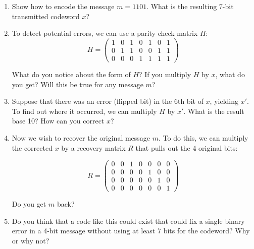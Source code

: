 \documentclass[11pt]{article}
\newif\ifsolutions
\begin{document}
\begin{enumerate}
\begin{enumerate}

\item Show how to encode the message $m=1101$.  What is the resulting 7-bit transmitted codeword $x$?
\vspace{15mm}

\ifsolutions 
\vspace{-15mm}
{\color{blue}{
\textbf{Solutions:} $Gm = x = 1010101$.
}}
\fi

\item To detect potential errors, we can use a parity check matrix $H$:
\[ H = \left( \begin{array}{ccccccc} 1 & 0 & 1 & 0 & 1 & 0 & 1 \\
0 & 1 & 1 & 0 & 0 & 1 & 1 \\
0 & 0 & 0 & 1 & 1 & 1 & 1
\end{array} \right)
\]

What do you notice about the form of $H$?  If you multiply $H$ by $x$, what do you get? Will this be true for any message $m$?
\vspace{10mm}

\item Suppose that there was an error (flipped bit) in the 6th bit of $x$, yielding $x'$. To find out where it occurred, we can multiply $H$ by $x'$. What is the result base 10? How can you correct $x$?
\vspace{15mm}

\ifsolutions 
\vspace{-15mm}
{\color{blue}{
\textbf{Solutions:} We actually received $x' = 1010111$. Computing $Hx'$, we get the sixth column of $H$, which corresponds to 6 in binary, so we know the 6th bit should be flipped to correct $x$.
}}
\fi

\item Now we wish to recover the original message $m$. To do this, we can multiply the corrected $x$ by a recovery matrix $R$ that pulls out the 4 original bits:

\[ R = \left( \begin{array}{ccccccc} 0 & 0 & 1 & 0 & 0 & 0 & 0 \\
0 & 0 & 0 & 0 & 1 & 0 & 0 \\
0 & 0 & 0 & 0 & 0 & 1 & 0 \\
0 & 0 & 0 & 0 & 0 & 0 & 1
\end{array} \right)
\]   

Do you get $m$ back?

\vspace{10mm}

\ifsolutions 
{\color{blue}{
\textbf{Solutions:} After correcting $x$, we compute $Rx = m$, and get back $m=1101$.
}}
\fi

\item Do you think that a code like this could exist that could fix a single binary error in a 4-bit message without using at least 7 bits for the codeword? Why or why not?

\end{enumerate}
 \end{enumerate}
\end{document}

